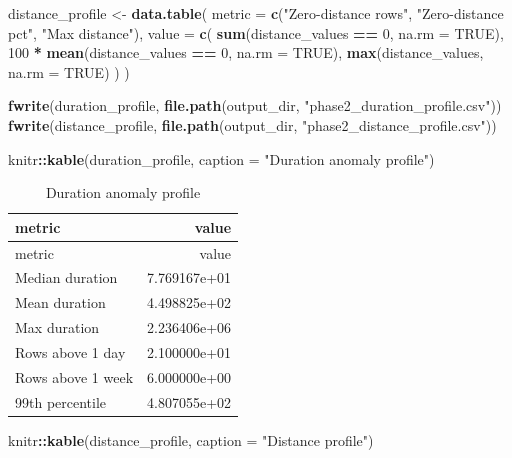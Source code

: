\documentclass[
]{article}
\newenvironment{Shaded}{\begin{snugshade}}{\end{snugshade}}
\newcommand{\AttributeTok}[1]{\textcolor[rgb]{0.13,0.29,0.53}{#1}}
\newcommand{\ConstantTok}[1]{\textcolor[rgb]{0.56,0.35,0.01}{#1}}
\newcommand{\DecValTok}[1]{\textcolor[rgb]{0.00,0.00,0.81}{#1}}
\newcommand{\FunctionTok}[1]{\textcolor[rgb]{0.13,0.29,0.53}{\textbf{#1}}}
\newcommand{\NormalTok}[1]{#1}
\newcommand{\OtherTok}[1]{\textcolor[rgb]{0.56,0.35,0.01}{#1}}
\newcommand{\SpecialCharTok}[1]{\textcolor[rgb]{0.81,0.36,0.00}{\textbf{#1}}}
\newcommand{\StringTok}[1]{\textcolor[rgb]{0.31,0.60,0.02}{#1}}
\begin{document}
\begin{Shaded}
\begin{Highlighting}[]
\NormalTok{distance\_profile }\OtherTok{\textless{}{-}} \FunctionTok{data.table}\NormalTok{(}
  \AttributeTok{metric =} \FunctionTok{c}\NormalTok{(}\StringTok{"Zero{-}distance rows"}\NormalTok{, }\StringTok{"Zero{-}distance pct"}\NormalTok{, }\StringTok{"Max distance"}\NormalTok{),}
  \AttributeTok{value =} \FunctionTok{c}\NormalTok{(}
    \FunctionTok{sum}\NormalTok{(distance\_values }\SpecialCharTok{==} \DecValTok{0}\NormalTok{, }\AttributeTok{na.rm =} \ConstantTok{TRUE}\NormalTok{),}
    \DecValTok{100} \SpecialCharTok{*} \FunctionTok{mean}\NormalTok{(distance\_values }\SpecialCharTok{==} \DecValTok{0}\NormalTok{, }\AttributeTok{na.rm =} \ConstantTok{TRUE}\NormalTok{),}
    \FunctionTok{max}\NormalTok{(distance\_values, }\AttributeTok{na.rm =} \ConstantTok{TRUE}\NormalTok{)}
\NormalTok{  )}
\NormalTok{)}

\FunctionTok{fwrite}\NormalTok{(duration\_profile, }\FunctionTok{file.path}\NormalTok{(output\_dir, }\StringTok{"phase2\_duration\_profile.csv"}\NormalTok{))}
\FunctionTok{fwrite}\NormalTok{(distance\_profile, }\FunctionTok{file.path}\NormalTok{(output\_dir, }\StringTok{"phase2\_distance\_profile.csv"}\NormalTok{))}

\NormalTok{knitr}\SpecialCharTok{::}\FunctionTok{kable}\NormalTok{(duration\_profile, }\AttributeTok{caption =} \StringTok{"Duration anomaly profile"}\NormalTok{)}
\end{Highlighting}
\end{Shaded}

\begin{longtable}[]{@{}lr@{}}
\caption{Duration anomaly profile}\tabularnewline
\toprule\noalign{}
metric & value \\
\midrule\noalign{}
\endfirsthead
\toprule\noalign{}
metric & value \\
\midrule\noalign{}
\endhead
\bottomrule\noalign{}
\endlastfoot
Median duration & 7.769167e+01 \\
Mean duration & 4.498825e+02 \\
Max duration & 2.236406e+06 \\
Rows above 1 day & 2.100000e+01 \\
Rows above 1 week & 6.000000e+00 \\
99th percentile & 4.807055e+02 \\
\end{longtable}

\begin{Shaded}
\begin{Highlighting}[]
\NormalTok{knitr}\SpecialCharTok{::}\FunctionTok{kable}\NormalTok{(distance\_profile, }\AttributeTok{caption =} \StringTok{"Distance profile"}\NormalTok{)}
\end{Highlighting}
\end{Shaded}
\end{document}
